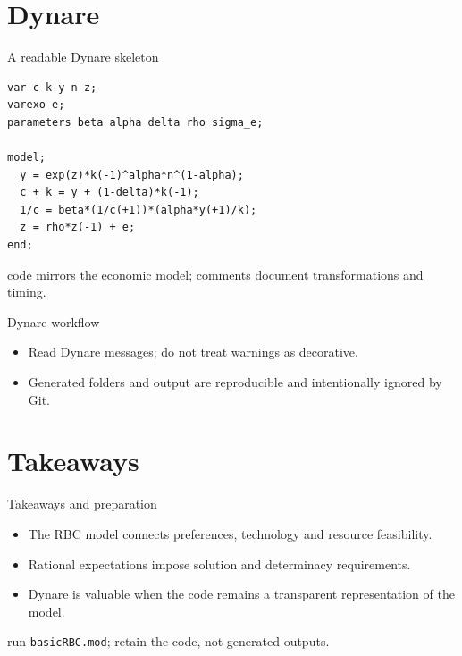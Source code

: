 \documentclass[aspectratio=169,10pt]{beamer}
\begin{document}
\section{Dynare}
\begin{frame}[fragile]{A readable Dynare skeleton}\small\begin{verbatim}
var c k y n z;
varexo e;
parameters beta alpha delta rho sigma_e;

model;
  y = exp(z)*k(-1)^alpha*n^(1-alpha);
  c + k = y + (1-delta)*k(-1);
  1/c = beta*(1/c(+1))*(alpha*y(+1)/k);
  z = rho*z(-1) + e;
end;
\end{verbatim}
\vfill{} code mirrors the economic model; comments document transformations and timing.
\end{frame}
\begin{frame}{Dynare workflow}\centering{}
\vfill\begin{itemize}\item Read Dynare messages; do not treat warnings as decorative.\item Generated folders and output are reproducible and intentionally ignored by Git.\end{itemize}\end{frame}
\section{Takeaways}
\begin{frame}{Takeaways and preparation}\begin{itemize}\item The RBC model connects preferences, technology and resource feasibility.\item Rational expectations impose solution and determinacy requirements.\item Dynare is valuable when the code remains a transparent representation of the model.\end{itemize}\vfill{} run \texttt{basicRBC.mod}; retain the code, not generated outputs.\end{frame}
\end{document}
